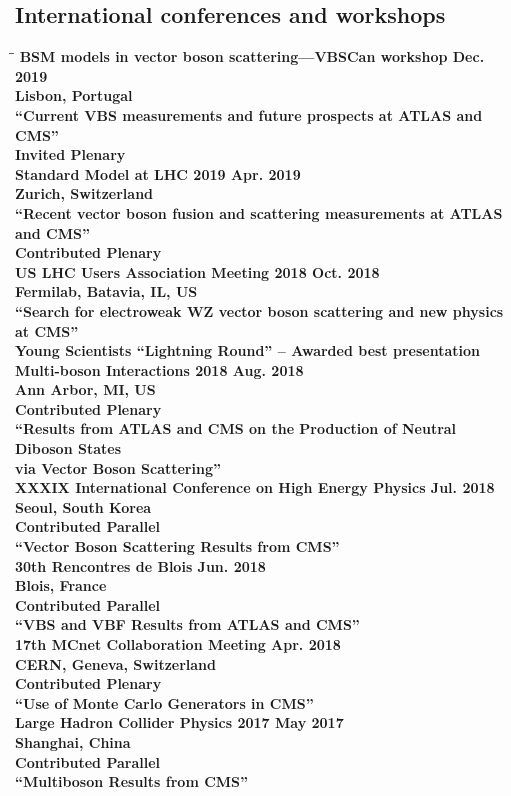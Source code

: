 \documentclass[10pt]{res} %
\begin{document}
\begin{resume}
\subsection{International conferences and workshops}
\vspace{-0.1in}
\begin{tabbing}
\hspace{2.3in}\= \hspace{2.6in}\= \kill %
\bf{BSM models in vector boson scattering---VBSCan workshop} 		 \> \>	    Dec. 2019 \\
Lisbon, Portugal \\
``Current VBS measurements and future prospects at ATLAS and CMS'' \\
Invited Plenary \\
\bf{Standard Model at LHC 2019} 		 \> \>	    Apr. 2019 \\
Zurich, Switzerland \\
``Recent vector boson fusion and scattering measurements at ATLAS and CMS'' \\
Contributed Plenary \\ 
\bf{US LHC Users Association Meeting 2018} 		 \> \>	    Oct. 2018 \\
Fermilab, Batavia, IL, US \\
``Search for electroweak WZ vector boson scattering and new physics at CMS'' \\
Young Scientists ``Lightning Round'' -- Awarded best presentation \\ 
\bf{Multi-boson Interactions 2018} 		 \> \>	    Aug. 2018 \\
Ann Arbor, MI, US \\
Contributed Plenary \\ 
``Results from ATLAS and CMS on the Production of Neutral Diboson States \\via Vector Boson Scattering'' \\
\bf{XXXIX International Conference on High Energy Physics} 		 \> \>	    Jul. 2018 \\
Seoul, South Korea\\
Contributed Parallel\\ 
``Vector Boson Scattering Results from CMS'' \\
\bf{30th Rencontres de Blois} 		 \> \>	    Jun. 2018 \\
Blois, France\\
Contributed Parallel\\ 
``VBS and VBF Results from ATLAS and CMS'' \\
\bf{17th MCnet Collaboration Meeting} 		 \> \>	    Apr. 2018 \\
CERN, Geneva, Switzerland \\
Contributed Plenary\\ 
``Use of Monte Carlo Generators in CMS'' \\
\bf{Large Hadron Collider Physics 2017} 		 \> \>	    May 2017 \\
Shanghai, China \\
Contributed Parallel \\ 
``Multiboson Results from CMS'' \\


\end{tabbing}
\end{resume}
\end{document}
